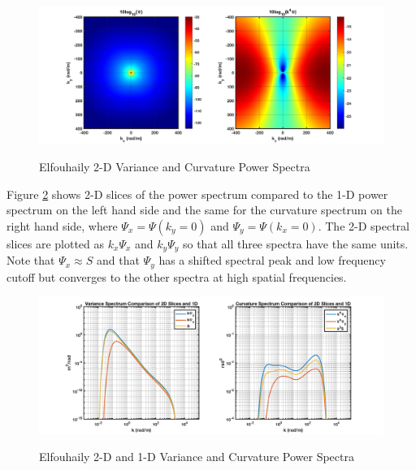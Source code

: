 \begin{figure}[ht]
  \begin{center}
\includegraphics[width=6in]{../media/Ocean_Surface/elf_variance_curvature_spectrum_2D.png}
  \end{center}
  \renewcommand{\baselinestretch}{1} \small\normalsize
  \begin{quote}
    \caption[Elfouhaily 2-D Variance and Curvature Power Spectra]{Elfouhaily 2-D Variance and Curvature Power Spectra\label{os_fig:7bb}}
  \end{quote}
\end{figure}
\renewcommand{\baselinestretch}{2} \small\normalsize

Figure \ref{os_fig:7bc} shows 2-D slices of the power spectrum compared to the 1-D power spectrum on the left hand side and the same for the curvature spectrum on the right hand side, where $\Psi_x = \Psi(k_y = 0)$ and $\Psi_y = \Psi(k_x = 0)$. The 2-D spectral slices are plotted as $k_x\Psi_x$ and $k_y\Psi_y$ so that all three spectra have the same units. Note that $\Psi_x \approx S$ and that $\Psi_y$ has a shifted spectral peak and low frequency cutoff but converges to the other spectra at high spatial frequencies.

\begin{figure}[ht]
  \begin{center}
\includegraphics[width=6in]{../media/Ocean_Surface/elf_variance_curvature_spectrum_2D_slices.png}
  \end{center}
  \renewcommand{\baselinestretch}{1} \small\normalsize
  \begin{quote}
    \caption[Elfouhaily 2-D and 1D Variance and Curvature Power Spectra]{Elfouhaily 2-D and 1-D Variance and Curvature Power Spectra\label{os_fig:7bc}}
  \end{quote}
\end{figure}
\renewcommand{\baselinestretch}{2} \small\normalsize

